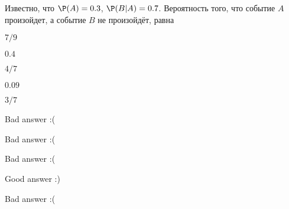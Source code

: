 
\begin{question}
Известно, что \(\P(A)= 0.3\), \(\P(B|A)=0.7\). Вероятность того, что
событие \(A\) произойдет, а событие \(B\) не произойдёт, равна
\begin{answerlist}
  \item \(7/9\)
  \item \(0.4\)
  \item \(4/7\)
  \item \(0.09\)
  \item \(3/7\)
\end{answerlist}
\end{question}

\begin{solution}
\begin{answerlist}
  \item Bad answer :(
  \item Bad answer :(
  \item Bad answer :(
  \item Good answer :)
  \item Bad answer :(
\end{answerlist}
\end{solution}

